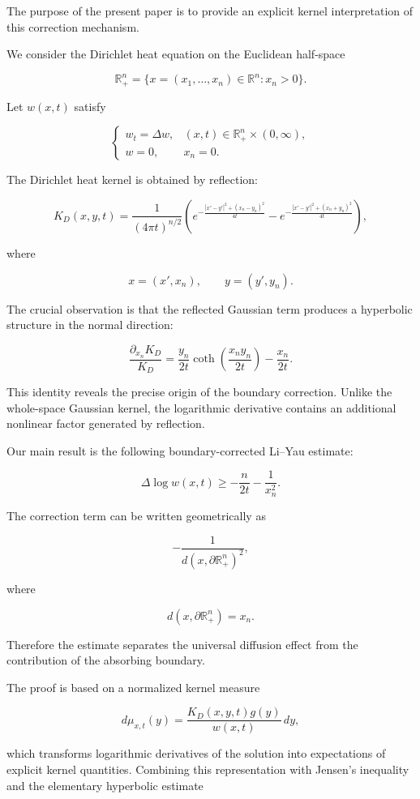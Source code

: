 \documentclass[11pt]{amsart}
\theoremstyle{definition}
\theoremstyle{remark}
\begin{document}
The purpose of the present paper is to provide an explicit kernel
interpretation of this correction mechanism.

We consider the Dirichlet heat equation on the Euclidean half-space

\[
\mathbb R^n_+
=
\{x=(x_1,\ldots,x_n)\in\mathbb R^n:x_n>0\}.
\]

Let $w(x,t)$ satisfy

\[
\begin{cases}
w_t=\Delta w,
&
(x,t)\in\mathbb R^n_+\times(0,\infty),
\\[1mm]
w=0,
&
x_n=0 .
\end{cases}
\]


The Dirichlet heat kernel is obtained by reflection:

\[
K_D(x,y,t)
=
\frac1{(4\pi t)^{n/2}}
\left(
e^{-\frac{|x'-y'|^2+(x_n-y_n)^2}{4t}}
-
e^{-\frac{|x'-y'|^2+(x_n+y_n)^2}{4t}}
\right),
\]

where

\[
x=(x',x_n),
\qquad
y=(y',y_n).
\]


The crucial observation is that the reflected Gaussian term
produces a hyperbolic structure in the normal direction:

\[
\frac{\partial_{x_n}K_D}{K_D}
=
\frac{y_n}{2t}
\coth
\left(
\frac{x_ny_n}{2t}
\right)
-
\frac{x_n}{2t}.
\]


This identity reveals the precise origin of the boundary correction.
Unlike the whole-space Gaussian kernel, the logarithmic derivative
contains an additional nonlinear factor generated by reflection.


Our main result is the following boundary-corrected Li--Yau
estimate:

\[
\boxed{
\Delta\log w(x,t)
\geq
-\frac n{2t}
-\frac1{x_n^2}
}.
\]


The correction term can be written geometrically as

\[
-\frac1{d(x,\partial\mathbb R^n_+)^2},
\]

where

\[
d(x,\partial\mathbb R^n_+)=x_n .
\]

Therefore the estimate separates the universal diffusion effect from
the contribution of the absorbing boundary.


The proof is based on a normalized kernel measure

\[
d\mu_{x,t}(y)
=
\frac{K_D(x,y,t)g(y)}{w(x,t)}\,dy ,
\]

which transforms logarithmic derivatives of the solution into
expectations of explicit kernel quantities. Combining this
representation with Jensen's inequality and the elementary
hyperbolic estimate
\end{document}
